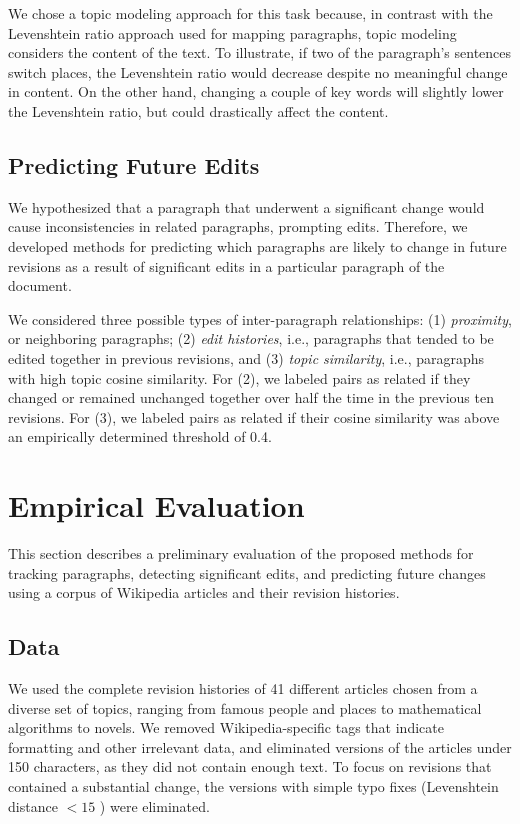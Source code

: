We chose a topic modeling approach for this task because, in contrast
with the Levenshtein ratio approach used for mapping paragraphs, topic
modeling considers the content of the text. To illustrate, if two of the
paragraph's sentences switch places, the Levenshtein ratio would
decrease despite no meaningful change in content. On the other hand,
changing a couple of key words will slightly lower the Levenshtein
ratio, but could drastically affect the content.

\subsection{Predicting Future Edits}\label{predicting-future-edits}

We hypothesized that a paragraph that underwent a significant change
would cause inconsistencies in related paragraphs, prompting edits.
Therefore, we developed methods for predicting which paragraphs are
likely to change in future revisions as a result of significant edits in
a particular paragraph of the document.

We considered three possible types of inter-paragraph relationships: (1)
\emph{proximity}, or neighboring paragraphs; (2) \emph{edit histories},
i.e., paragraphs that tended to be edited together in previous
revisions, and (3) \emph{topic similarity}, i.e., paragraphs with high
topic cosine similarity. For (2), we labeled pairs as related if they
changed or remained unchanged together over half the time in the
previous ten revisions. For (3), we labeled pairs as related if their
cosine similarity was above an empirically determined threshold of 0.4.

\section{Empirical Evaluation}\label{empirical-evaluation}

This section describes a preliminary evaluation of the proposed methods
for tracking paragraphs, detecting significant edits, and predicting
future changes using a corpus of Wikipedia articles and their revision
histories.

\subsection{Data}\label{data}

We used the complete revision histories of 41 different articles chosen
from a diverse set of topics, ranging from famous people and places to
mathematical algorithms to novels. We removed Wikipedia-specific tags
that indicate formatting and other irrelevant data, and eliminated
versions of the articles under 150 characters, as they did not contain
enough text. To focus on revisions that contained a substantial change,
the versions with simple typo fixes (Levenshtein distance \(< 15\) )
were eliminated.

